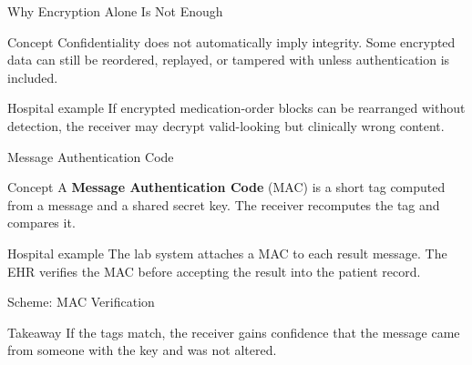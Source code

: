 \documentclass[presentation]{beamer}
\begin{document}
\begin{frame}[c]{Why Encryption Alone Is Not Enough}
\begin{block}{Concept}
Confidentiality does not automatically imply integrity. Some encrypted data can still be reordered,
replayed, or tampered with unless authentication is included.
\end{block}

\begin{exampleblock}{Hospital example}
If encrypted medication-order blocks can be rearranged without detection, the receiver may decrypt
valid-looking but clinically wrong content.
\end{exampleblock}
\end{frame}

\begin{frame}[c]{Message Authentication Code}
\begin{block}{Concept}
A \textbf{Message Authentication Code} (MAC) is a short tag computed from a message and a shared
secret key. The receiver recomputes the tag and compares it.
\end{block}

\begin{exampleblock}{Hospital example}
The lab system attaches a MAC to each result message. The EHR verifies the MAC before accepting
the result into the patient record.
\end{exampleblock}
\end{frame}

\begin{frame}[c]{Scheme: MAC Verification}
\begin{center}
\end{center}

\begin{block}{Takeaway}
If the tags match, the receiver gains confidence that the message came from someone with the key
and was not altered.
\end{block}
\end{frame}
\end{document}
